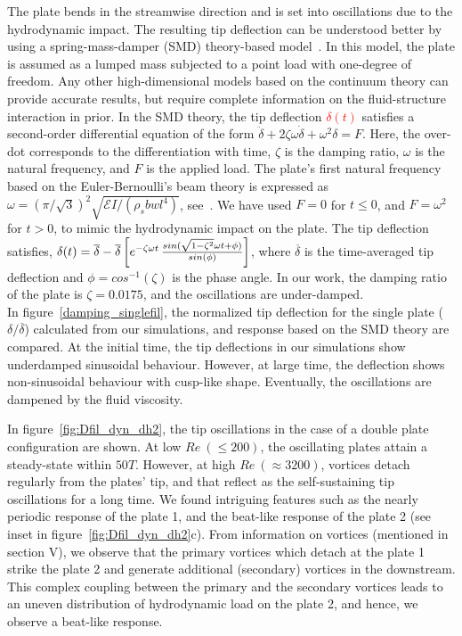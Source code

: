 \documentclass[aps,pre,twocolumn,aps,longbibliography]{revtex4-1}
\begin{document}
	The plate bends in the streamwise direction and is set into oscillations due to the hydrodynamic impact. The resulting tip deflection can be understood better by using a spring-mass-damper (SMD) theory-based model~\cite{Kelley2004}. In this model, the plate is assumed as a lumped mass subjected to a point load with one-degree of freedom. Any other high-dimensional models based on the continuum theory can provide accurate results, but require complete information on the fluid-structure interaction in prior. In the SMD theory, the tip deflection \textcolor{red}{$\delta(t)$} satisfies a second-order differential equation of the form $\ddot{\delta}+2\zeta\omega\dot{\delta}+\omega^2 \delta=F$. Here, the over-dot corresponds to the differentiation with time, $\zeta$ is the damping ratio, $\omega$ is the natural frequency, and $F$ is the applied load. The plate's first natural frequency based on the Euler-Bernoulli's beam theory is expressed as $\omega=\left(\pi/\sqrt{3}\right)^2\sqrt{\mathcal{E}I/(\rho_s bwl^4)}$, see~\cite{Kelley2004}. We have used $F=0$ for $t\le 0$, and $F=\omega^2$ for $t>0$, to mimic the hydrodynamic impact on the plate. The tip deflection satisfies, $\delta(t) = \overline{\delta} -\overline{\delta}\left[e^{-\zeta \omega t}\,{sin(\sqrt{1-\zeta^2} \omega t+\phi)\over sin(\phi)}\right]$, where $\overline{\delta}$ is the time-averaged tip deflection and $\phi=cos^{-1}(\zeta)$ is the phase angle. In our work, the damping ratio of the plate is $\zeta=0.0175$, and the oscillations are under-damped.\\
	
	
	
	
	In figure~\ref{damping_singlefil}, the normalized tip deflection for the single plate ($\delta/\overline{\delta}$) calculated from our simulations, and response based on the SMD theory are compared. At the initial time, the tip deflections in our simulations show underdamped sinusoidal behaviour. However, at large time, the deflection shows non-sinusoidal behaviour with cusp-like shape. Eventually, the oscillations are dampened by the fluid viscosity.
	
	In figure~\ref{fig:Dfil_dyn_dh2}, the tip oscillations in the case of a double plate configuration are shown. At low $Re~(\le200)$, the oscillating plates attain a steady-state within $50T$. However, at high $Re~(\approx3200)$, vortices detach regularly from the plates' tip, and that reflect as the self-sustaining tip oscillations for a long time. We found intriguing features such as the nearly periodic response of the plate 1, and the beat-like response of the plate 2 (see inset in figure~\ref{fig:Dfil_dyn_dh2}c). From information on vortices (mentioned in section V), we observe that the primary vortices which detach at the plate 1 strike the plate 2 and generate additional (secondary) vortices in the downstream. This complex coupling between the primary and the secondary vortices leads to an uneven distribution of hydrodynamic load on the plate 2, and hence, we observe a beat-like response.
	
\end{document}
